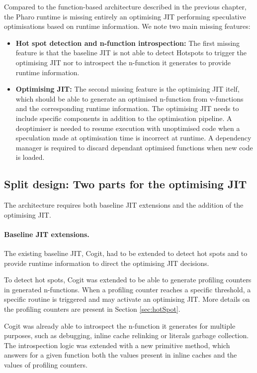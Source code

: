 \documentclass[a4paper,12pt,twoside]{../includes/ThesisStyle}
\begin{document}
Compared to the function-based architecture described in the previous chapter, the Pharo runtime is missing entirely an optimising JIT performing speculative optimisations based on runtime information. We note two main missing features:
\begin{itemize}
	\item \textbf{Hot spot detection and n-function introspection:} The first missing feature is that the baseline JIT is not able to detect Hotspots to trigger the optimising JIT nor to introspect the n-function it generates to provide runtime information. 
	\item \textbf{Optimising JIT:} The second missing feature is the optimising JIT itelf, which should be able to generate an optimised n-function from v-functions and the corresponding runtime information. The optimising JIT needs to include specific components in addition to the optimisation pipeline. A deoptimiser is needed to resume execution with unoptimised code when a speculation made at optimisation time is incorrect at runtime. A dependency manager is required to discard dependant optimised functions when new code is loaded.
\end{itemize}

\subsection{Split design: Two parts for the optimising JIT}
\label{sec:splitDesign}

The architecture requires both baseline JIT extensions and the addition of the optimising JIT.

\paragraph{Baseline JIT extensions.}
The existing baseline JIT, Cogit, had to be extended to detect hot spots and to provide runtime information to direct the optimising JIT decisions. 

To detect hot spots, Cogit was extended to be able to generate profiling counters in generated n-functions. When a profiling counter reaches a specific threshold, a specific routine is triggered and may activate an optimising JIT. More details on the profiling counters are present in Section \ref{sec:hotSpot}.

Cogit was already able to introspect the n-function it generates for multiple purposes, such as debugging, inline cache relinking or literals garbage collection. The introspection logic was extended with a new primitive method, which answers for a given function both the values present in inline caches and the values of profiling counters.
\end{document}
